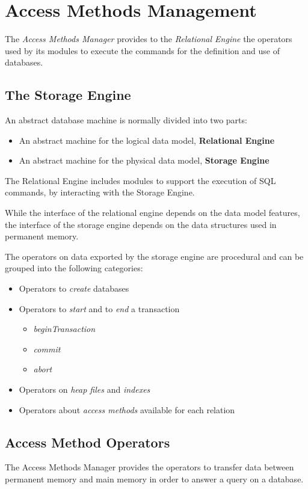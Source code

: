 \chapter{Access Methods Management}
The \textit{Access Methods Manager} provides to the \textit{Relational Engine} the operators used by its modules to execute the commands for the definition and use of databases.

\section{The Storage Engine}
An abstract database machine is normally divided into two parts:
\begin{itemize}
    \item An abstract machine for the logical data model, \textbf{Relational Engine}
    \item An abstract machine for the physical data model, \textbf{Storage Engine}
\end{itemize}
The Relational Engine includes modules to support the execution of SQL commands, by interacting with the Storage Engine.

While the interface of the relational engine depends on the data model features, the interface of the storage engine depends on the data structures used in permanent memory.

The operators on data exported by the storage engine are procedural and can be grouped into the following categories:
\begin{itemize}
    \item Operators to \textit{create} databases
    \item Operators to \textit{start} and to \textit{end} a transaction
    \begin{itemize}
        \item \textit{beginTransaction}
        \item \textit{commit}
        \item \textit{abort}
    \end{itemize}
    \item Operators on \textit{heap files} and \textit{indexes}
    \item Operators about \textit{access methods} available for each relation
\end{itemize}

\section{Access Method Operators}
\begin{tcolorbox}
The Access Methods Manager provides the operators to transfer data between permanent memory and main memory in order to answer a query on a database.
\end{tcolorbox}

